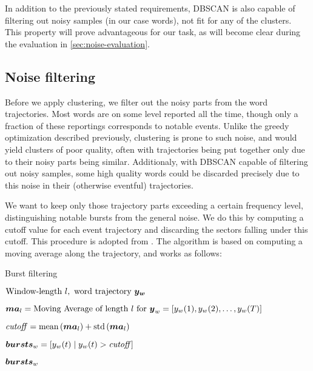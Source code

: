 In addition to the previously stated requirements, DBSCAN is also capable of filtering out noisy samples (in our case words), not fit for any of the clusters. This property will prove advantageous for our task, as will become clear during the evaluation in \autoref{sec:noise-evaluation}.


\subsection{Noise filtering} \label{subsec:noise-filtering}
Before we apply clustering, we filter out the noisy parts from the word trajectories. Most words are on some level reported all the time, though only a fraction of these reportings corresponds to notable events. Unlike the greedy optimization described previously, clustering is prone to such noise, and would yield clusters of poor quality, often with trajectories being put together only due to their noisy parts being similar. Additionaly, with DBSCAN capable of filtering out noisy samples, some high quality words could be discarded precisely due to this noise in their (otherwise eventful) trajectories.

We want to keep only those trajectory parts exceeding a certain frequency level, distinguishing notable bursts from the general noise. We do this by computing a cutoff value for each event trajectory and discarding the sectors falling under this cutoff. This procedure is adopted from \cite{online-search-queries}. The algorithm is based on computing a moving average along the trajectory, and works as follows:

\begin{algorithm}[H]
\begin{algorithmic}[1]
\caption{Burst filtering}
\label{alg:burst-filtering}
\Input $\text{Window-length} \ l,\ \text{word trajectory} \ \vect{\traj_{w}}$

\State $\vect{MA}_{l} = \text{Moving Average of length} ~ l ~ \text{for} ~ \vect{\traj}_{w} = \left[ \traj_{w}(1), \traj_{w}(2), \dots, \traj_{w}(\streamlen) \right]$

\State $\mathit{cutoff} = \text{mean} \left( \vect{MA}_{l} \right) + \text{std} \left( \vect{MA}_{l} \right)$

\State $\vect{bursts}_{w} = \left[ \traj_{w}(t) \mid \traj_{w	}(t) > \mathit{cutoff} \right]$

\Output $\vect{bursts}_{w}$
\end{algorithmic}
\end{algorithm}


